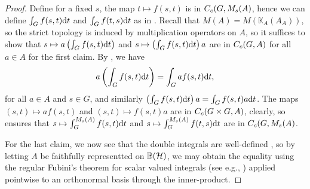 \begin{proof}
Define for a fixed $s$, the map $t \mapsto f(s,t)$ is in $C_c(G,M_s(A)$, hence we can define $\int_G f(s,t) \mathrm{d} t$ and $\int_G f(t,s) \mathrm{d} t$ as in . Recall that $M(A) = M(\mathbb{K}_A(A_A))$, so the strict topology is induced by multiplication operators on $A$, so it suffices to show that $s \mapsto a \left(\int_Gf(s,t) \mathrm{d} t\right)$ and $s \mapsto \left(\int_G f(s,t) \mathrm{d} t\right) a $ are in $C_c(G,A)$ for all $ a \in A$ for the first claim. By , we have 
\begin{align*}
a \left( \int_G f(s,t) \mathrm{d} t \right) = \int_G a f(s,t) \mathrm{d} t,
\end{align*}
for all $a \in A$ and $s \in G$, and similarly $\left( \int_G f(s,t) \mathrm{d} t \right)a = \int_G f(s,t) a \mathrm{d} t$. The maps $(s,t) \mapsto a f(s,t)$ and $(s,t) \mapsto f(s,t) a$ are in $C_c(G \times G , A)$, clearly, so  ensures that $s \mapsto \int_G^{M_s(A)} f(s,t) \mathrm{d} t$ and $s \mapsto \int_G ^{M_s(A)} f(t,s) \mathrm{d} t$ are in $C_c(G,M_s(A)$.

For the last claim, we now see that the double integrals are well-defined , so by letting $A$ be faithfully representted on $\mathbb{B}(\mathcal{H})$, we may obtain the equality using the regular Fubini's theorem for scalar valued integrals (see e.g., \cite{schilling}) applied pointwise to an orthonormal basis through the inner-product.
\end{proof}


